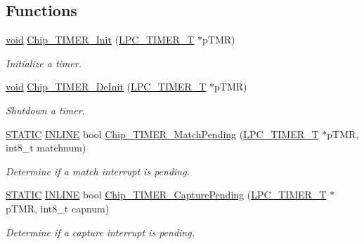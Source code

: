 \subsection*{Functions}
\begin{DoxyCompactItemize}
\item 
\hyperlink{Paradigm_2Tern__EE_2small_2portmacro_8h_a14d32f8130d3c0b212cfc751730b5b49}{void} \hyperlink{group__TIMER__17XX__40XX_gac2ca0aff00ae8a651e129afba400c833}{Chip\-\_\-\-T\-I\-M\-E\-R\-\_\-\-Init} (\hyperlink{structLPC__TIMER__T}{L\-P\-C\-\_\-\-T\-I\-M\-E\-R\-\_\-\-T} $\ast$p\-T\-M\-R)
\begin{DoxyCompactList}\small\item\em Initialize a timer. \end{DoxyCompactList}\item 
\hyperlink{Paradigm_2Tern__EE_2small_2portmacro_8h_a14d32f8130d3c0b212cfc751730b5b49}{void} \hyperlink{group__TIMER__17XX__40XX_gaa52f3e33303d7d4f1e2325586a21a5c0}{Chip\-\_\-\-T\-I\-M\-E\-R\-\_\-\-De\-Init} (\hyperlink{structLPC__TIMER__T}{L\-P\-C\-\_\-\-T\-I\-M\-E\-R\-\_\-\-T} $\ast$p\-T\-M\-R)
\begin{DoxyCompactList}\small\item\em Shutdown a timer. \end{DoxyCompactList}\item 
\hyperlink{group__LPC__Types__Public__Macros_ga10b2d890d871e1489bb02b7e70d9bdfb}{S\-T\-A\-T\-I\-C} \hyperlink{group__LPC__Types__Public__Types_ga2eb6f9e0395b47b8d5e3eeae4fe0c116}{I\-N\-L\-I\-N\-E} bool \hyperlink{group__TIMER__17XX__40XX_ga0d61fd61d18ba82d44f1b5fec2e48a76}{Chip\-\_\-\-T\-I\-M\-E\-R\-\_\-\-Match\-Pending} (\hyperlink{structLPC__TIMER__T}{L\-P\-C\-\_\-\-T\-I\-M\-E\-R\-\_\-\-T} $\ast$p\-T\-M\-R, int8\-\_\-t matchnum)
\begin{DoxyCompactList}\small\item\em Determine if a match interrupt is pending. \end{DoxyCompactList}\item 
\hyperlink{group__LPC__Types__Public__Macros_ga10b2d890d871e1489bb02b7e70d9bdfb}{S\-T\-A\-T\-I\-C} \hyperlink{group__LPC__Types__Public__Types_ga2eb6f9e0395b47b8d5e3eeae4fe0c116}{I\-N\-L\-I\-N\-E} bool \hyperlink{group__TIMER__17XX__40XX_gae9a2575f38b3acaf6255caf15c5b65df}{Chip\-\_\-\-T\-I\-M\-E\-R\-\_\-\-Capture\-Pending} (\hyperlink{structLPC__TIMER__T}{L\-P\-C\-\_\-\-T\-I\-M\-E\-R\-\_\-\-T} $\ast$p\-T\-M\-R, int8\-\_\-t capnum)
\begin{DoxyCompactList}\small\item\em Determine if a capture interrupt is pending. \end{DoxyCompactList}\item 

\end{DoxyCompactItemize}
